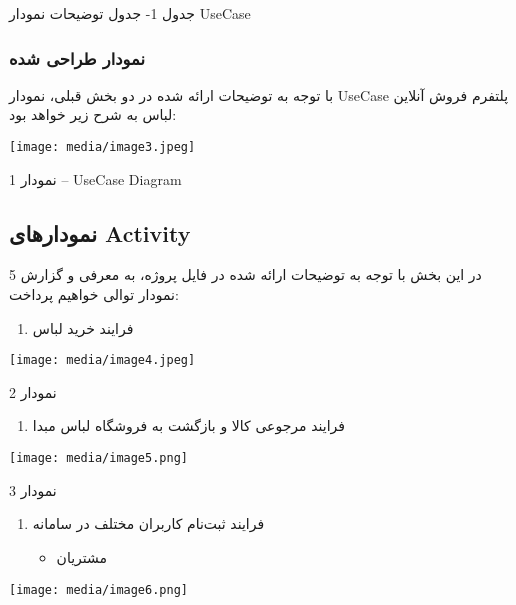 \documentclass[]{article}
\begin{document}
جدول 1- جدول توضیحات نمودار UseCase

\subsubsection{نمودار طراحی
شده}\label{ux646ux645ux648ux62fux627ux631-ux637ux631ux627ux62dux6cc-ux634ux62fux647}

با توجه به توضیحات ارائه شده در دو بخش قبلی، نمودار UseCase پلتفرم فروش
آنلاین لباس به شرح زیر خواهد بود:

\texttt{[image: media/image3.jpeg]}

نمودار 1 -- UseCase Diagram

\subsection{نمودارهای
Activity}\label{ux646ux645ux648ux62fux627ux631ux647ux627ux6cc-activity}

در این بخش با توجه به توضیحات ارائه شده در فایل پروژه، به معرفی و گزارش
5 نمودار توالی خواهیم پرداخت:

\begin{enumerate}
\def\labelenumi{\arabic{enumi})}
\item
  فرایند خرید لباس
\end{enumerate}

\texttt{[image: media/image4.jpeg]}

نمودار 2

\begin{enumerate}
\def\labelenumi{\arabic{enumi})}
\item
  فرایند مرجوعی کالا و بازگشت به فروشگاه لباس مبدا
\end{enumerate}

\texttt{[image: media/image5.png]}

نمودار 3

\begin{enumerate}
\def\labelenumi{\arabic{enumi})}
\item
  فرایند ثبت‌نام کاربران مختلف در سامانه

  \begin{itemize}
  \item
    مشتریان
  \end{itemize}
\end{enumerate}

\texttt{[image: media/image6.png]}
\end{document}
